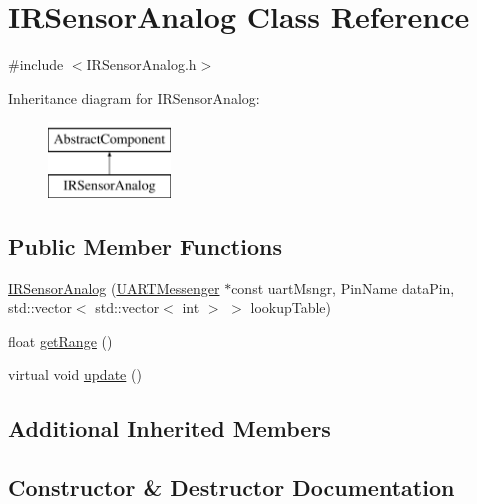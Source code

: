 \hypertarget{class_i_r_sensor_analog}{}\section{I\+R\+Sensor\+Analog Class Reference}
\label{class_i_r_sensor_analog}


{\ttfamily \#include $<$I\+R\+Sensor\+Analog.\+h$>$}

Inheritance diagram for I\+R\+Sensor\+Analog\+:\begin{figure}[H]
\begin{center}
\leavevmode
\includegraphics[height=2.000000cm]{class_i_r_sensor_analog}
\end{center}
\end{figure}
\subsection*{Public Member Functions}
\begin{DoxyCompactItemize}
\item 
\hyperlink{class_i_r_sensor_analog_af27166832035783b3df081014c4dfb9d}{I\+R\+Sensor\+Analog} (\hyperlink{class_u_a_r_t_messenger}{U\+A\+R\+T\+Messenger} $\ast$const uart\+Msngr, Pin\+Name data\+Pin, std\+::vector$<$ std\+::vector$<$ int $>$ $>$ lookup\+Table)
\item 
float \hyperlink{class_i_r_sensor_analog_aa6642b85ec1018980e216eab0dfd27f2}{get\+Range} ()
\item 
virtual void \hyperlink{class_i_r_sensor_analog_a919942de7c5fc3af5da9a2b32e31d328}{update} ()
\end{DoxyCompactItemize}
\subsection*{Additional Inherited Members}


\subsection{Constructor \& Destructor Documentation}
\mbox{\label{class_i_r_sensor_analog_af27166832035783b3df081014c4dfb9d}} 
